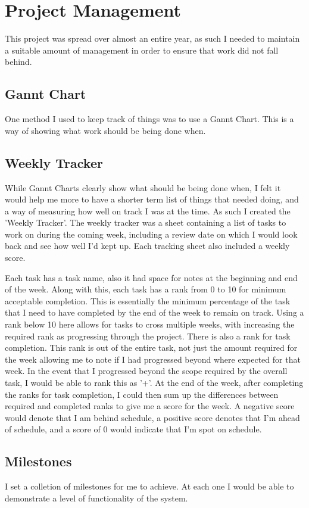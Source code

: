 \newpage
\section{Project Management}
This project was spread over almost an entire year, as such I needed to maintain a suitable amount of management in order to ensure that work did not fall behind.

\subsection{Gannt Chart}
One method I used to keep track of things was to use a Gannt Chart. This is a way of showing what work should be being done when.

\subsection{Weekly Tracker}
While Gannt Charts clearly show what should be being done when, I felt it would help me more to have a shorter term list of things that needed doing, and a way of measuring how well on track I was at the time. As such I created the 'Weekly Tracker'.
The weekly tracker was a sheet containing a list of tasks to work on during the coming week, including a review date on which I would look back and see how well I'd kept up. Each tracking sheet also included a weekly score.

Each task has a task name, also it had space for notes at the beginning and end of the week. Along with this, each task has a rank from 0 to 10 for minimum acceptable completion. This is essentially the minimum percentage of the task that I need to have completed by the end of the week to remain on track. Using a rank below 10 here allows for tasks to cross multiple weeks, with increasing the required rank as progressing through the project.
There is also a rank for task completion. This rank is out of the entire task, not just the amount required for the week allowing me to note if I had progressed beyond where expected for that week. In the event that I progressed beyond the scope required by the overall task, I would be able to rank this as '+'.
At the end of the week, after completing the ranks for task completion, I could then sum up the differences between required and completed ranks to give me a score for the week.
A negative score would denote that I am behind schedule, a positive score denotes that I'm ahead of schedule, and a score of 0 would indicate that I'm spot on schedule.

\subsection{Milestones}
I set a colletion of milestones for me to achieve. At each one I would be able to demonstrate a level of functionality of the system.
